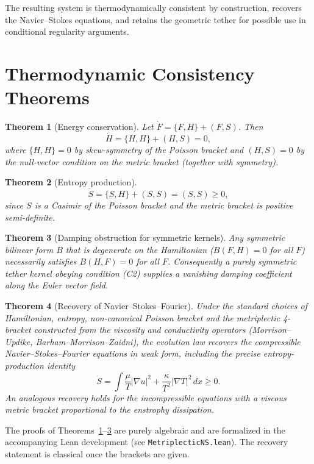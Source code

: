 \documentclass[11pt,a4paper]{article}
\newtheorem{theorem}{Theorem}[section]
\begin{document}
The resulting system is thermodynamically consistent by construction, recovers the Navier--Stokes equations, and retains the geometric tether for possible use in conditional regularity arguments.

\section{Thermodynamic Consistency Theorems}
\begin{theorem}[Energy conservation]
\label{thm:energy}
Let \(\dot F = \{F,H\} + (F,S)\). Then
\[
\dot H = \{H,H\} + (H,S) = 0,
\]
where \(\{H,H\}=0\) by skew-symmetry of the Poisson bracket and \((H,S)=0\) by the null-vector condition on the metric bracket (together with symmetry).
\end{theorem}

\begin{theorem}[Entropy production]
\label{thm:entropy}
\[
\dot S = \{S,H\} + (S,S) = (S,S) \ge 0,
\]
since \(S\) is a Casimir of the Poisson bracket and the metric bracket is positive semi-definite.
\end{theorem}

\begin{theorem}[Damping obstruction for symmetric kernels]
\label{thm:obstruction}
Any symmetric bilinear form \(B\) that is degenerate on the Hamiltonian (\(B(F,H)=0\) for all \(F\)) necessarily satisfies \(B(H,F)=0\) for all \(F\). Consequently a purely symmetric tether kernel obeying condition (C2) supplies a vanishing damping coefficient along the Euler vector field.
\end{theorem}

\begin{theorem}[Recovery of Navier--Stokes--Fourier]
\label{thm:recovery}
Under the standard choices of Hamiltonian, entropy, non-canonical Poisson bracket and the metriplectic 4-bracket constructed from the viscosity and conductivity operators (Morrison--Updike, Barham--Morrison--Zaidni), the evolution law recovers the compressible Navier--Stokes--Fourier equations in weak form, including the precise entropy-production identity
\[
\dot S = \int\frac{\mu}{T}|\nabla u|^2 + \frac{\kappa}{T^2}|\nabla T|^2\,dx \ge 0.
\]
An analogous recovery holds for the incompressible equations with a viscous metric bracket proportional to the enstrophy dissipation.
\end{theorem}

The proofs of Theorems~\ref{thm:energy}--\ref{thm:obstruction} are purely algebraic and are formalized in the accompanying Lean development (see \texttt{MetriplecticNS.lean}). The recovery statement is classical once the brackets are given.
\end{document}

